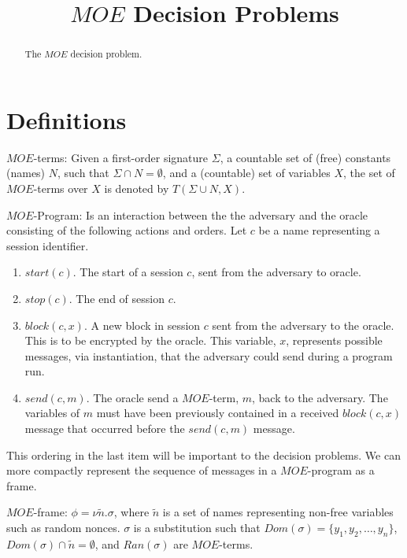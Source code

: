 \documentclass{llncs}
\title{ $MOE$ Decision Problems}
\begin{document}
\maketitle
\begin{abstract}
The $MOE$ decision problem. 

\end{abstract}

\section{Definitions}

\begin{definition}
	$MOE$-terms: Given a first-order signature $\Sigma$, a countable set of (free) constants (names) $N$, such that $\Sigma \cap N =\emptyset$, and a (countable) set of variables $X$, the set of $MOE$-terms over $X$ is denoted by $T(\Sigma \cup N,X)$. 
\end{definition}



\begin{definition}
	$MOE$-Program: Is an interaction between the 
	the adversary and the oracle consisting of the following actions
	and orders. Let $c$ be a name representing a session identifier.
	\begin{enumerate}
		\item $start(c)$. The start of a session $c$, sent from the
		adversary to oracle.
		\item $stop(c)$. The end of session $c$.
		\item $block(c, x)$. A new block in session $c$ sent from
		the adversary to the oracle. This is to be encrypted by the 
		oracle. This variable, $x$, represents possible messages, via
		instantiation, that the adversary could send during a program
		run. 
		\item $send(c, m)$. The oracle send a $MOE$-term, $m$, back
		to the adversary. The variables of $m$ must have been 
		previously contained in a received $block(c, x)$ message
		that occurred before the $send(c, m)$ message.
	\end{enumerate} 
\end{definition}
This ordering in the last item will be important to the decision 
problems. We can more compactly represent the sequence of messages
in a $MOE$-program as a frame. 

\begin{definition}
		$MOE$-frame:  $\phi = \nu \tilde{n}.\sigma$, where
		$\tilde{n}$ is a set of names representing non-free variables such as random nonces. $\sigma$ is a substitution
		such that $Dom(\sigma) = \{ y_1, y_2, \ldots, y_n\}$,
		$Dom(\sigma) \cap \tilde{n} = \emptyset$, and
		$Ran(\sigma)$ are $MOE$-terms.  
\end{definition}
\end{document}
